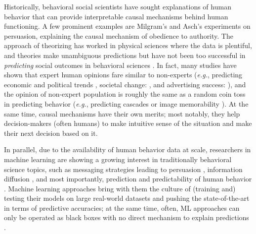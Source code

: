 Historically, behavioral social scientists have sought explanations of human behavior that can provide interpretable causal mechanisms behind human functioning. A few prominent examples are Milgram's \cite{milgram1978obedience} and Asch's \cite{asch1948doctrine} experiments on persuasion, explaining the causal mechanism of obedience to authority. The approach of theorizing has worked in physical sciences where the data is plentiful, and theories make unambiguous predictions but have not been too successful in \textit{predicting} social outcomes in behavioral sciences \cite{open2015estimating,tetlock2017expert,forecasting2023insights}. In fact, many studies have shown that expert human opinions fare similar to non-experts (\textit{e.g.}, predicting economic and political trends \cite{tetlock2017expert}, societal change: \cite{forecasting2023insights}, and advertising success: \cite{singh2024measuring}), and the opinion of non-expert population is roughly the same as a random coin toss in predicting behavior (\textit{e.g.}, predicting cascades \cite{tan2014effect} or image memorability \cite{isola2013makes}). At the same time, causal mechanisms have their own merits; most notably, they help decision-makers (often humans) to make intuitive sense of the situation and make their next decision based on it. 


In parallel, due to the availability of human behavior data at scale, researchers in machine learning are showing a growing interest in traditionally behavioral science topics, such as messaging strategies leading to persuasion \cite{habernal2016makes,kumar2023persuasion,luu2019measuring,bhattacharya2023video}, information diffusion \cite{cheng2014can,martin2016exploring}, and most importantly, prediction and predictability of human behavior \cite{choi2012predicting,song2010limits}. Machine learning approaches bring with them the culture of (training and) testing their models on large real-world datasets and pushing the state-of-the-art in terms of predictive accuracies; at the same time, often, ML approaches can only be operated as black boxes with no direct mechanism to explain predictions \cite{salganik2019bit,singla2022audio}.


